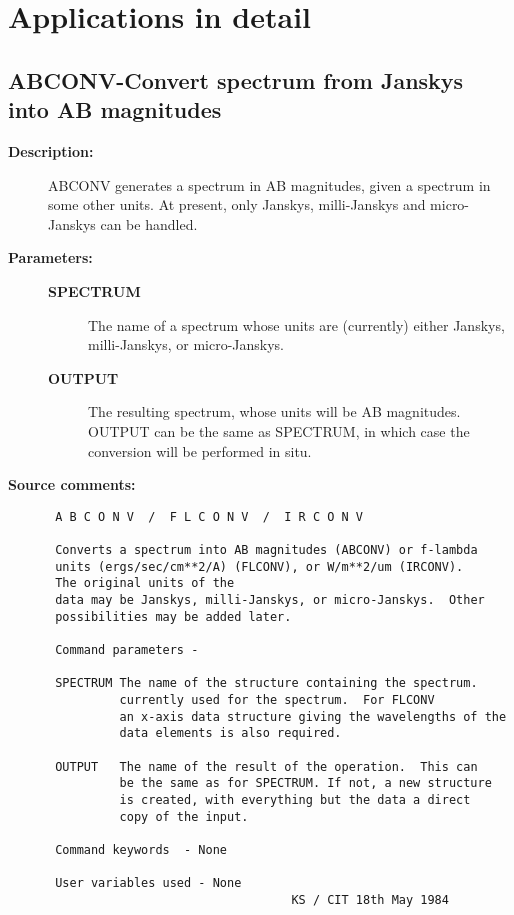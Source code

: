 \section{\label{applic}Applications in detail}
\subsection{ABCONV-\label{ABCONV}Convert spectrum from Janskys into AB magnitudes}
\begin{description}

\item [{\bf Description:}]
 ABCONV generates a spectrum in AB magnitudes, given a spectrum in
 some other units.  At present, only Janskys, milli-Janskys and
 micro-Janskys can be handled.

\item [{\bf Parameters:}]
\begin{description}
\item [{\bf SPECTRUM}]
 The name of a spectrum whose units are (currently)
 either Janskys, milli-Janskys, or micro-Janskys.
\item [{\bf OUTPUT}]
 The resulting spectrum, whose units will be AB magnitudes.
 OUTPUT can be the same as SPECTRUM, in which case the
 conversion will be performed in situ.
\end{description}

\item [{\bf Source comments:}]
\begin{verbatim}
 A B C O N V  /  F L C O N V  /  I R C O N V

 Converts a spectrum into AB magnitudes (ABCONV) or f-lambda
 units (ergs/sec/cm**2/A) (FLCONV), or W/m**2/um (IRCONV).
 The original units of the
 data may be Janskys, milli-Janskys, or micro-Janskys.  Other
 possibilities may be added later.

 Command parameters -

 SPECTRUM The name of the structure containing the spectrum.
          currently used for the spectrum.  For FLCONV
          an x-axis data structure giving the wavelengths of the
          data elements is also required.

 OUTPUT   The name of the result of the operation.  This can
          be the same as for SPECTRUM. If not, a new structure
          is created, with everything but the data a direct
          copy of the input.

 Command keywords  - None

 User variables used - None
                                  KS / CIT 18th May 1984
\end{verbatim}
\end{description}
